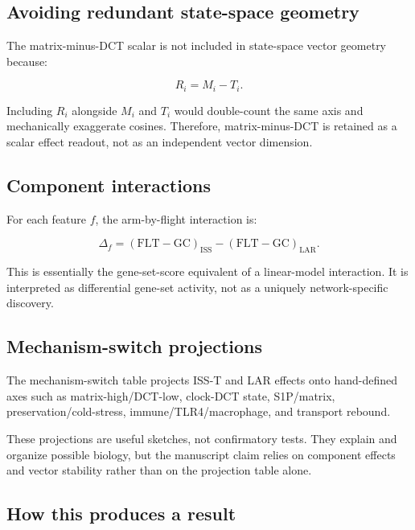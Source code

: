 \documentclass[11pt]{article}
\begin{document}
\subsection{Avoiding redundant state-space geometry}

The matrix-minus-DCT scalar is not included in state-space vector geometry because:

\begin{equation}
R_i=M_i-T_i.
\end{equation}

Including $R_i$ alongside $M_i$ and $T_i$ would double-count the same axis and mechanically exaggerate cosines. Therefore, matrix-minus-DCT is retained as a scalar effect readout, not as an independent vector dimension.

\subsection{Component interactions}

For each feature $f$, the arm-by-flight interaction is:

\begin{equation}
\Delta_f=(\mathrm{FLT}-\mathrm{GC})_{\mathrm{ISS}}-(\mathrm{FLT}-\mathrm{GC})_{\mathrm{LAR}}.
\end{equation}

This is essentially the gene-set-score equivalent of a linear-model interaction. It is interpreted as differential gene-set activity, not as a uniquely network-specific discovery.

\subsection{Mechanism-switch projections}

The mechanism-switch table projects ISS-T and LAR effects onto hand-defined axes such as matrix-high/DCT-low, clock-DCT state, S1P/matrix, preservation/cold-stress, immune/TLR4/macrophage, and transport rebound.

These projections are useful sketches, not confirmatory tests. They explain and organize possible biology, but the manuscript claim relies on component effects and vector stability rather than on the projection table alone.

\subsection{How this produces a result}
\end{document}
